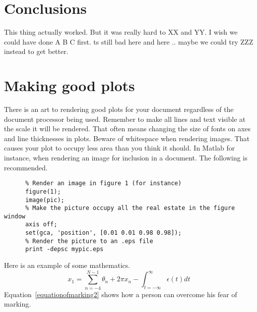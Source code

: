 \documentclass[11pt, a4paper]{article}
\begin{document}
\section{Conclusions}
This thing actually worked. But it was really hard to XX and YY. I wish we could have done A B C first. ts still bad here and here .. maybe we could try ZZZ instead to get better.
 
 \appendix 
 \section{Making good plots}
 There is an art to rendering good plots for your document regardless of the document processor being used. Remember to make all lines and text visible at the scale it will be rendered. That often means changing the size of fonts on axes and line thicknesses in plots. Beware of whitespace when rendering images. That causes your plot to occupy less area than you think it should. In Matlab for instance, when rendering an image for inclusion in a document. The following is recommended.
\begin{center}
 \begin{minipage}{\textwidth}
    \begin{verbatim}
      % Render an image in figure 1 (for instance)
      figure(1); 
      image(pic); 
      % Make the picture occupy all the real estate in the figure window
      axis off; 
      set(gca, 'position', [0.01 0.01 0.98 0.98]);
      % Render the picture to an .eps file
      print -depsc mypic.eps  
    \end{verbatim}
 \end{minipage}
\end{center}




Here is an example of some mathematics.
\begin{equation}
    x_1 = \sum_{n=-4}^{N-1} \theta_n + 2\pi x_n - \int_{t=-\infty}^{\infty} \epsilon(t) dt \label{equationofmarking2}
\end{equation}
Equation~\ref{equationofmarking2} shows how a person can overcome his fear of marking.




\end{document}
